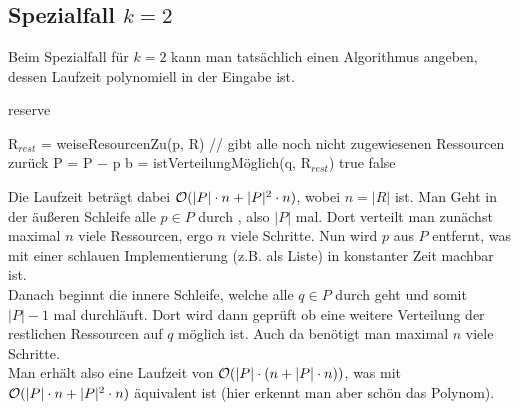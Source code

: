 \documentclass[a4paper]{article}
\begin{document}
	\maketitle
	\section{}
		\subsection{}
		\subsection{Spezialfall $k=2$}
			Beim Spezialfall für $k=2$ kann man tatsächlich einen Algorithmus angeben, dessen Laufzeit polynomiell in der Eingabe ist.
		\begin{breakablealgorithm}
			\caption{reserve}
			\begin{algorithmic}[1]
						\State R$_{rest}$ = weiseResourcenZu(p, R) // gibt alle noch nicht zugewiesenen Ressourcen zurück
						\State P = P $-$ p
							\State b = istVerteilungMöglich(q, R$_{rest}$)
								\Return true
							\EndIf
						\EndFor
					\EndFor
					\Return false
				\EndProcedure
			\end{algorithmic}
		\end{breakablealgorithm}
		Die Laufzeit beträgt dabei $\mathcal{O}(|P|\cdot n+|P|^2\cdot n)$, wobei $n=|R|$ ist.\n
		Man Geht in der äußeren Schleife alle $p\in P$ durch , also $|P|$ mal. Dort verteilt man zunächst maximal $n$ viele Ressourcen, ergo $n$ viele Schritte. Nun wird $p$ aus $P$ entfernt, was mit einer schlauen Implementierung (z.B. als Liste) in konstanter Zeit machbar ist.\\
		Danach beginnt die innere Schleife, welche alle $q\in P$ durch geht und somit $|P|-1$ mal durchläuft. Dort wird dann geprüft ob eine weitere Verteilung der restlichen Ressourcen auf $q$ möglich ist. Auch da benötigt man maximal $n$ viele Schritte.\\
		Man erhält also eine Laufzeit von $\mathcal{O}(|P|\cdot(n+|P|\cdot n))$, was mit $\mathcal{O}(|P|\cdot n+|P|^2\cdot n)$ äquivalent ist (hier erkennt man aber schön das Polynom).
		\subsection{}
		\subsection{}
\end{document}
